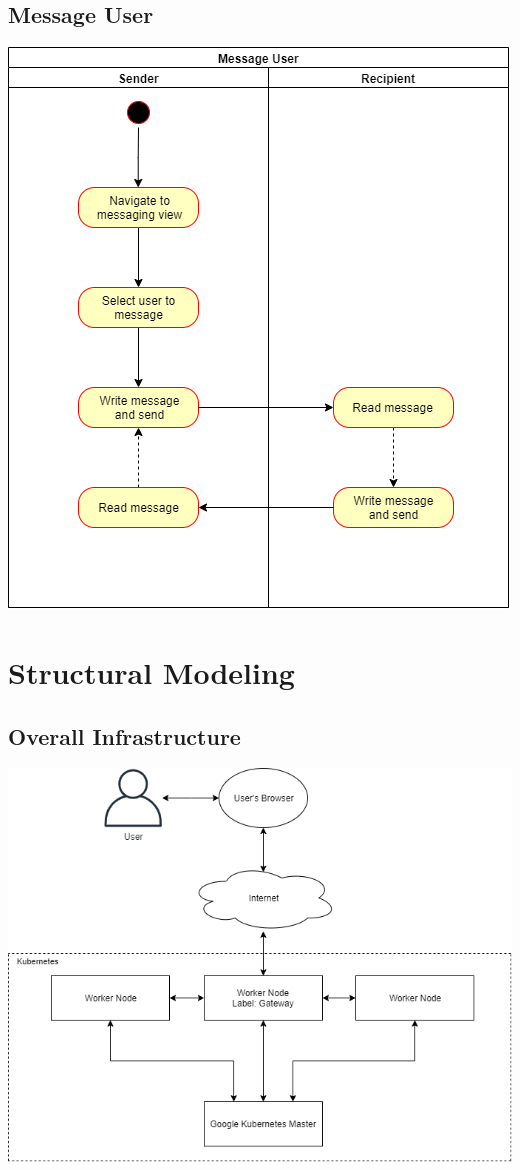 \documentclass[12pt]{article}
\begin{document}
    \subsection{Message User}
    \begin{center}\includegraphics[width=\textwidth]{images/MessageUser.png}\end{center}

\section{Structural Modeling}
    \subsection{Overall Infrastructure}
        \begin{center}\includegraphics[width=\textwidth]{images/hardware-diagram.png}\end{center}
\end{document}
